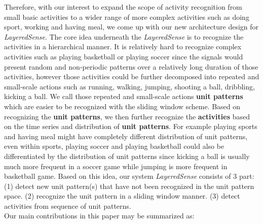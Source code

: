 \documentclass[a4paper, 10pt, conference]{IEEEtran}      %
\begin{document}
Therefore, with our interest to expand the scope of activity recognition from small basic activities to a wider range of more complex activities such as doing sport, working and having meal, we come up with our new architecture design for \emph{LayeredSense}. The core idea underneath the \emph{LayeredSense} is to recognize the activities in a hierarchical manner. It is relatively hard to recognize complex activities such as playing basketball or playing soccer since the signals would present random and non-periodic patterns over a relatively long duration of those activities, however those activities could be further decomposed into repeated and small-scale actions such as running, walking, jumping, shooting a ball, dribbling, kicking a ball. We call those repeated and small-scale actions \textbf{unit patterns} which are easier to be recognized with the sliding window scheme. Based on recognizing the \textbf{unit patterns}, we then further recognize the \textbf{activities} based on the time series and distribution of \textbf{unit patterns}. For example playing sports and having meal might have completely different distribution of unit patterns, even within sports, playing soccer and playing basketball could also be differentiated by the distribution of unit patterns since kicking a ball is usually much more frequent in a soccer game while jumping is more frequent in basketball game.  Based on this idea, our system \emph{LayeredSense} consists of 3 part: (1) detect new unit pattern(s) that have not been recognized in the unit pattern space. (2) recognize the unit pattern in a sliding window manner. (3) detect activities from sequence of unit patterns.\\
Our main contributions in this paper may be summarized as:
\end{document}
